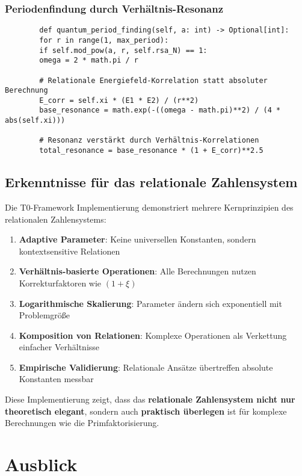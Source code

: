\documentclass[11pt,a4paper]{article}
\begin{document}
	\subsubsection{Periodenfindung durch Verhältnis-Resonanz}
	\begin{verbatim}
		def quantum_period_finding(self, a: int) -> Optional[int]:
		for r in range(1, max_period):
		if self.mod_pow(a, r, self.rsa_N) == 1:
		omega = 2 * math.pi / r
		
		# Relationale Energiefeld-Korrelation statt absoluter Berechnung
		E_corr = self.xi * (E1 * E2) / (r**2)
		base_resonance = math.exp(-((omega - math.pi)**2) / (4 * abs(self.xi)))
		
		# Resonanz verstärkt durch Verhältnis-Korrelationen
		total_resonance = base_resonance * (1 + E_corr)**2.5
	\end{verbatim}
	
	\subsection{Erkenntnisse für das relationale Zahlensystem}
	
	Die T0-Framework Implementierung demonstriert mehrere Kernprinzipien des relationalen Zahlensystems:
	
	\begin{enumerate}
		\item \textbf{Adaptive Parameter}: Keine universellen Konstanten, sondern kontextsensitive Relationen
		\item \textbf{Verhältnis-basierte Operationen}: Alle Berechnungen nutzen Korrekturfaktoren wie $(1 + \xi)$
		\item \textbf{Logarithmische Skalierung}: Parameter ändern sich exponentiell mit Problemgröße
		\item \textbf{Komposition von Relationen}: Komplexe Operationen als Verkettung einfacher Verhältnisse
		\item \textbf{Empirische Validierung}: Relationale Ansätze übertreffen absolute Konstanten messbar
	\end{enumerate}
	
	Diese Implementierung zeigt, dass das \textbf{relationale Zahlensystem nicht nur theoretisch elegant}, sondern auch \textbf{praktisch überlegen} ist für komplexe Berechnungen wie die Primfaktorisierung.
	
	\section{Ausblick}
	
\end{document}
